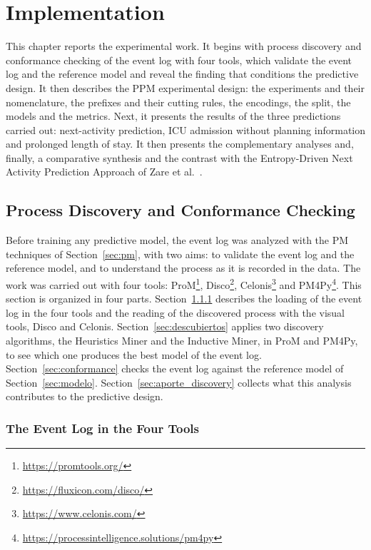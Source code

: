 \chapter{Implementation}
\label{cap:implementacion}

This chapter reports the experimental work. It begins with process discovery and conformance checking of the event log with four tools, which validate the event log and the reference model and reveal the finding that conditions the predictive design. It then describes the PPM experimental design: the experiments and their nomenclature, the prefixes and their cutting rules, the encodings, the split, the models and the metrics. Next, it presents the results of the three predictions carried out: next-activity prediction, ICU admission without planning information and prolonged length of stay. It then presents the complementary analyses and, finally, a comparative synthesis and the contrast with the Entropy-Driven Next Activity Prediction Approach of Zare et al.\ \cite{zare2025}.

\section{Process Discovery and Conformance Checking}
\label{sec:discovery}

Before training any predictive model, the event log was analyzed with the PM techniques of Section~\ref{sec:pm}, with two aims: to validate the event log and the reference model, and to understand the process as it is recorded in the data. The work was carried out with four tools: ProM\footnote{\url{https://promtools.org/}}, Disco\footnote{\url{https://fluxicon.com/disco/}}, Celonis\footnote{\url{https://www.celonis.com/}} and PM4Py\footnote{\url{https://processintelligence.solutions/pm4py}}. This section is organized in four parts. Section~\ref{sec:cuatro_herramientas} describes the loading of the event log in the four tools and the reading of the discovered process with the visual tools, Disco and Celonis. Section~\ref{sec:descubiertos} applies two discovery algorithms, the Heuristics Miner and the Inductive Miner, in ProM and PM4Py, to see which one produces the best model of the event log. Section~\ref{sec:conformance} checks the event log against the reference model of Section~\ref{sec:modelo}. Section~\ref{sec:aporte_discovery} collects what this analysis contributes to the predictive design.

\subsection{The Event Log in the Four Tools}
\label{sec:cuatro_herramientas}

